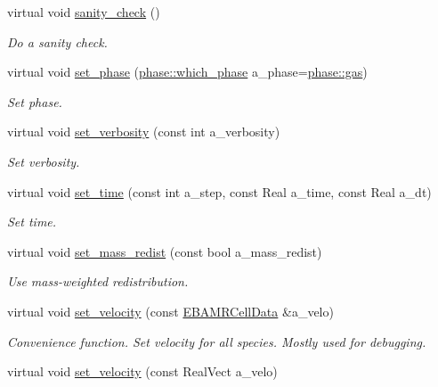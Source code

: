 \begin{DoxyCompactItemize}
virtual void \hyperlink{classcdr__layout_ad9f8739908824c386be71470a04853bf}{sanity\+\_\+check} ()
\begin{DoxyCompactList}\small\item\em Do a sanity check. \end{DoxyCompactList}\item 
virtual void \hyperlink{classcdr__layout_a4ab2df7bf33277d9010a7662e08abd64}{set\+\_\+phase} (\hyperlink{namespacephase_a23c76f548a5eb1955ed8c929c541108b}{phase\+::which\+\_\+phase} a\+\_\+phase=\hyperlink{namespacephase_a23c76f548a5eb1955ed8c929c541108bad0a7c1eb8fd916c8b7ec85be0fd23b38}{phase\+::gas})
\begin{DoxyCompactList}\small\item\em Set phase. \end{DoxyCompactList}\item 
virtual void \hyperlink{classcdr__layout_ae01bdff6423f6f63b8aa3e95be479986}{set\+\_\+verbosity} (const int a\+\_\+verbosity)
\begin{DoxyCompactList}\small\item\em Set verbosity. \end{DoxyCompactList}\item 
virtual void \hyperlink{classcdr__layout_a1515b92a7f476b91ee44092d5837692f}{set\+\_\+time} (const int a\+\_\+step, const Real a\+\_\+time, const Real a\+\_\+dt)
\begin{DoxyCompactList}\small\item\em Set time. \end{DoxyCompactList}\item 
virtual void \hyperlink{classcdr__layout_af21843b22ad924579b54a7f341f06971}{set\+\_\+mass\+\_\+redist} (const bool a\+\_\+mass\+\_\+redist)
\begin{DoxyCompactList}\small\item\em Use mass-\/weighted redistribution. \end{DoxyCompactList}\item 
virtual void \hyperlink{classcdr__layout_af14e95c3461a3894d9e781eba11f8771}{set\+\_\+velocity} (const \hyperlink{type__definitions_8H_a7e610f301989e5e07781c5e338bdb7c3}{E\+B\+A\+M\+R\+Cell\+Data} \&a\+\_\+velo)
\begin{DoxyCompactList}\small\item\em Convenience function. Set velocity for all species. Mostly used for debugging. \end{DoxyCompactList}\item 
virtual void \hyperlink{classcdr__layout_aca60ac77976aea8539137e242f0445b3}{set\+\_\+velocity} (const Real\+Vect a\+\_\+velo)

\end{DoxyCompactItemize}
